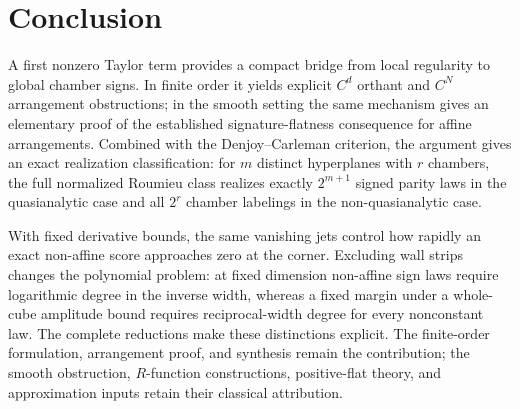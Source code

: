 \documentclass[11pt]{article}
\theoremstyle{definition}
\theoremstyle{remark}
\begin{document}
\section{Conclusion}

A first nonzero Taylor term provides a compact bridge from local regularity to global chamber signs. In finite order it yields explicit $C^d$ orthant and $C^N$ arrangement obstructions; in the smooth setting the same mechanism gives an elementary proof of the established signature-flatness consequence for affine arrangements. Combined with the Denjoy--Carleman criterion, the argument gives an exact realization classification: for $m$ distinct hyperplanes with $r$ chambers, the full normalized Roumieu class realizes exactly $2^{m+1}$ signed parity laws in the quasianalytic case and all $2^r$ chamber labelings in the non-quasianalytic case.

With fixed derivative bounds, the same vanishing jets control how rapidly an exact non-affine score approaches zero at the corner. Excluding wall strips changes the polynomial problem: at fixed dimension non-affine sign laws require logarithmic degree in the inverse width, whereas a fixed margin under a whole-cube amplitude bound requires reciprocal-width degree for every nonconstant law. The complete reductions make these distinctions explicit. The finite-order formulation, arrangement proof, and synthesis remain the contribution; the smooth obstruction, $R$-function constructions, positive-flat theory, and approximation inputs retain their classical attribution.
\end{document}
